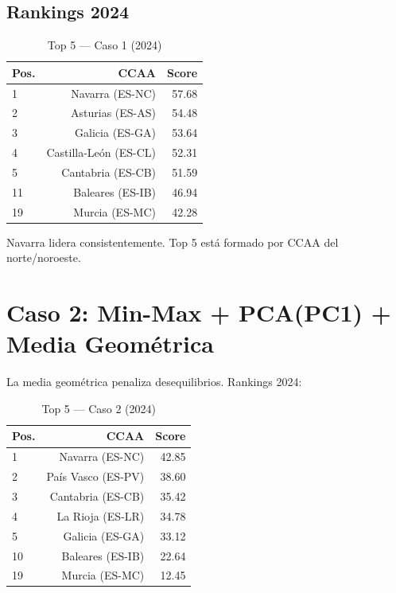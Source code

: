 \subsection{Rankings 2024}

\begin{table}[H]
    \centering
    \small
    \begin{tabular}{lrr}
        \toprule
        \textbf{Pos.} & \textbf{CCAA} & \textbf{Score} \\
        \midrule
        1 & Navarra (ES-NC) & 57.68 \\
        2 & Asturias (ES-AS) & 54.48 \\
        3 & Galicia (ES-GA) & 53.64 \\
        4 & Castilla-León (ES-CL) & 52.31 \\
        5 & Cantabria (ES-CB) & 51.59 \\
        \midrule
        11 & Baleares (ES-IB) & 46.94 \\
        19 & Murcia (ES-MC) & 42.28 \\
        \bottomrule
    \end{tabular}
    \caption{Top 5 — Caso 1 (2024)}
\end{table}

Navarra lidera consistentemente. Top 5 está formado por CCAA del norte/noroeste.

\section{Caso 2: Min-Max + PCA(PC1) + Media Geométrica}

La media geométrica penaliza desequilibrios. Rankings 2024:

\begin{table}[H]
    \centering
    \small
    \begin{tabular}{lrr}
        \toprule
        \textbf{Pos.} & \textbf{CCAA} & \textbf{Score} \\
        \midrule
        1 & Navarra (ES-NC) & 42.85 \\
        2 & País Vasco (ES-PV) & 38.60 \\
        3 & Cantabria (ES-CB) & 35.42 \\
        4 & La Rioja (ES-LR) & 34.78 \\
        5 & Galicia (ES-GA) & 33.12 \\
        \midrule
        10 & Baleares (ES-IB) & 22.64 \\
        19 & Murcia (ES-MC) & 12.45 \\
        \bottomrule
    \end{tabular}
    \caption{Top 5 — Caso 2 (2024)}
\end{table}

